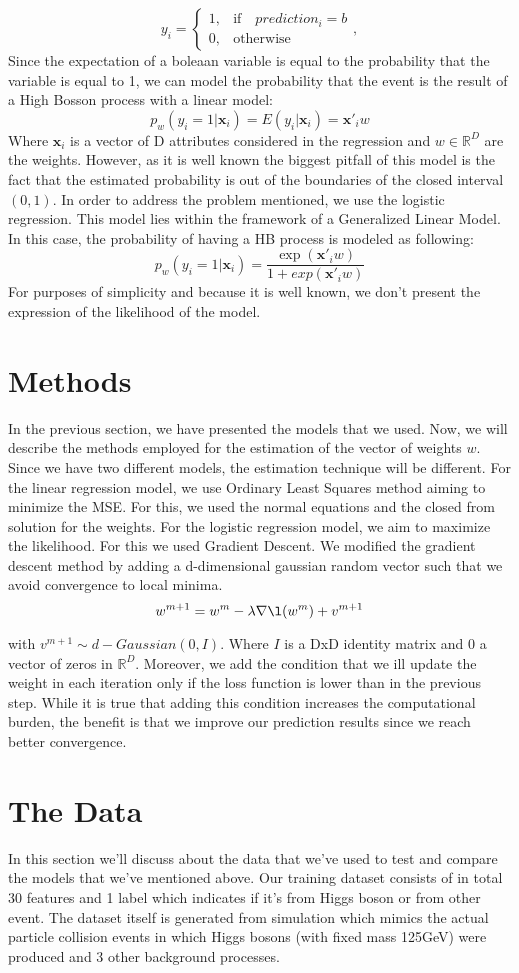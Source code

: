 \documentclass[10pt,conference,compsocconf]{IEEEtran}
\newcommand{\R}{\mathbb{R}}
\begin{document}
 $$
y_{i}=
\begin{cases}
1, & \text{if} \quad prediction_i=b\\
0, & \text{otherwise}
\end{cases}
, 
$$
Since the expectation of a boleaan variable is equal to the probability that the variable is equal to 1, we can model the probability that the event is the result of a High Bosson process with a linear model:
$$p_w(y_i=1|\textbf{x}_i)=E(y_i|\textbf{x}_i)=\textbf{x}'_i w$$
Where $\textbf{x}_i $ is a vector of D attributes considered in the regression and $w \in \R^D $ are the weights.
However, as it is well known the biggest pitfall of this model is the fact that the estimated probability is out of the boundaries of the closed interval $ ( 0,1 ) $. 
In order to address the problem mentioned, we use the logistic regression. This model lies within the framework of a Generalized Linear Model.  In this case, the probability of having a HB process is modeled as following:
$$p_w(y_i=1|\textbf{x}_i)=\frac{\exp(\textbf{x}'_i w)}{1+exp(\textbf{x}'_i w)}$$
For purposes of simplicity and because it is well known, we don't present the expression of the likelihood of the model.
\section{Methods}
In the previous section, we have presented the models that we used. Now, we will describe the methods employed for the estimation of the vector of weights $w$. Since we have two different models, the estimation technique will be different. 
For the linear regression model, we use Ordinary Least Squares method aiming to minimize the MSE. For this, we used the normal equations and the closed from solution for the weights. 
For the logistic regression model, we aim to maximize the likelihood. For this we used Gradient Descent. We modified the gradient descent method by adding a d-dimensional gaussian random vector such that we avoid convergence to local minima. 
$$w^{m+1}=w^{m}-\lambda  \nabla \l(w^m) +v^{m+1}$$

with $v^{m+1} \sim d-Gaussian(0,I)$. Where $I$ is a DxD identity matrix and 0 a vector of zeros in $\R^D$.
Moreover, we add the condition that we ill update the weight in each iteration only if the loss function is lower than in the previous step. While it is true that adding this condition increases the computational burden, the benefit is that we improve our prediction results since we reach better convergence.
\section{The Data}
\label{S1}
In this section we'll discuss about the data that we've used to test and compare the models that we've mentioned above. Our training dataset consists of in total 30 features and 1 label which indicates if it's from Higgs boson or from other event. The dataset itself is generated from simulation which mimics the actual particle collision events in which Higgs bosons (with fixed mass 125GeV) were produced and 3 other background processes. 
\end{document}
